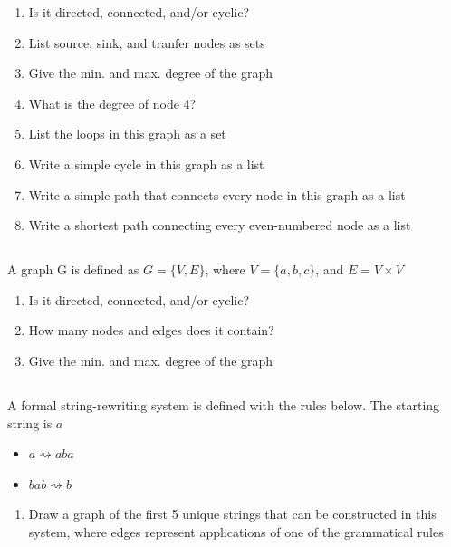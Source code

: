 \documentclass[twocolumn]{article}
\begin{document}
    \begin{enumerate}
        \item Is it directed, connected, and/or cyclic?
        \item List source, sink, and tranfer nodes as sets
        \item Give the min. and max. degree of the graph
        \item What is the degree of node 4?
        \item List the loops in this graph as a set
        \item Write a simple cycle in this graph as a list
        \item Write a simple path that connects every node in this graph as a list
        \item Write a shortest path connecting every even-numbered node as a list
    \end{enumerate}


\subsection{}

    A graph G is defined as $G = \{V, E\}$, where $V = \{ a, b, c \}$, and $E = V \times V$

    \begin{enumerate}
        \item Is it directed, connected, and/or cyclic?
        \item How many nodes and edges does it contain?
        \item Give the min. and max. degree of the graph
    \end{enumerate}

\subsection{}

    A formal string-rewriting system is defined with the rules below. The starting string is $a$
    
    \begin{itemize}
        \item $ a \rightsquigarrow aba $
        \item $bab \rightsquigarrow b$
    \end{itemize} 

    \begin{enumerate}
        \item Draw a graph of the first 5 unique strings that can be constructed in this system, where edges represent applications of one of the  grammatical rules
    \end{enumerate}
\end{document}
